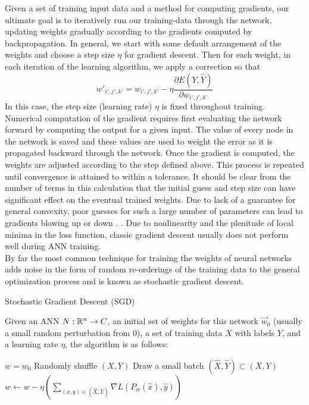 Given a set of training input data and a method for computing gradients, our ultimate goal is to iteratively run our training-data through the network, updating weights gradually according to the gradients computed by backpropagation. In general, we start with some
default arrangement of the weights and choose a step
size $\eta$ for gradient descent. Then for each weight, in each iteration
of the learning algorithm, we apply a correction so that 
\[w'_{i',j',k'} = w_{i',j',k'}-\eta \frac{\partial E(Y,\hat Y)}{\partial
    w_{i',j',k'}}\]
    In this case, the step size (learning rate) $\eta$ is fixed throughout training.
    Numerical computation of the gradient requires first evaluating the network forward by computing the output for a given input. The value of every node in the network is saved and these values are used to weight the error as it is propagated backward through the network. Once the gradient is computed, the weights are adjusted according to the step defined above. This process is repeated until convergence is attained to within a tolerance. It should be
clear from the number of terms in this calculation that the initial
guess and step size can have significant effect on the eventual trained weights.
Due to lack of a guarantee for general convexity, poor guesses for such a large number of parameters can lead
to gradients blowing up or down   \cite{Bishop:2006:PRM:1162264}. 
. Due to nonlinearity and the plenitude of local minima in the loss function, classic gradient descent usually does not perform well during ANN training. \\ 
By far the most common technique for training the weights of neural networks adds noise in the form of random re-orderings of the training data to the general optimization process and is known as stochastic gradient descent. 
\begin{definition}{Stochastic Gradient Descent (SGD)}

Given an ANN $N: \mathbb{R}^n \to C$, an initial set of weights for this network $\vec w_0$ (usually a small random perturbation from 0), a set of training data $X$ with labels $Y$, and a learning rate $\eta$, the algorithm is as follows: 

\begin{algorithm}
\caption*{Batch Stochastic Gradient Descent}\label{sgd}
\begin{algorithmic}[H]
\State $w = w_0$
 
\State Randomly shuffle $(X,Y)$
\State Draw a small batch $(\hat X, \hat Y) \subset (X, Y)$
\State $w \leftarrow w - \eta \left(\sum_{(x,y) \in (\hat X, \hat Y)}  \nabla L(P_w(\hat x), \hat y)\right)$
\EndWhile
\end{algorithmic}
\end{algorithm}
\end{definition}
